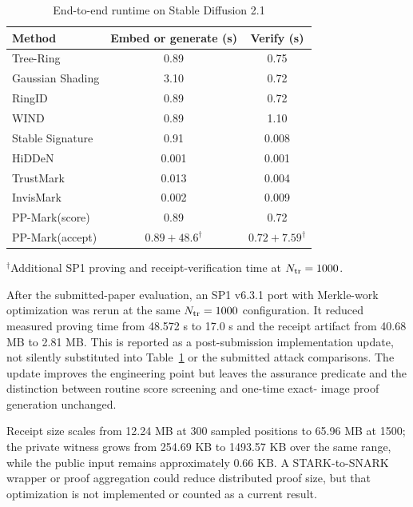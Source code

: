 \begin{table}[H]
    \centering
    \caption{End-to-end runtime on Stable Diffusion 2.1}
    \label{tab:ch4-runtime}
    \small
    \setlength{\tabcolsep}{15pt}
    \renewcommand{\arraystretch}{1.13}
    \begin{tabular}{@{}lcc@{}}
        \toprule
        Method & Embed or generate (s) & Verify (s) \\
        \midrule
        Tree-Ring        & 0.89 & 0.75 \\
        Gaussian Shading & 3.10 & 0.72 \\
        RingID           & 0.89 & 0.72 \\
        WIND             & 0.89 & 1.10 \\
        Stable Signature & 0.91 & 0.008 \\
        HiDDeN           & 0.001 & 0.001 \\
        TrustMark        & 0.013 & 0.004 \\
        InvisMark        & 0.002 & 0.009 \\
        PP-Mark(score)   & 0.89 & 0.72 \\
        PP-Mark(accept)  & \(0.89+48.6^{\dagger}\) & \(0.72+7.59^{\dagger}\) \\
        \bottomrule
    \end{tabular}

    \vspace{2pt}
    \parbox{0.92\textwidth}{\footnotesize
    \(^{\dagger}\)Additional SP1 proving and receipt-verification time at
    \(N_{\mathrm{tr}}=1000\).}
\end{table}

After the submitted-paper evaluation, an SP1 v6.3.1 port with Merkle-work
optimization was rerun at the same \(N_{\mathrm{tr}}=1000\) configuration.  It
reduced measured proving time from 48.572 s to 17.0 s and the receipt artifact from
40.68 MB to 2.81 MB.  This is reported as a post-submission implementation update,
not silently substituted into Table~\ref{tab:ch4-runtime} or the submitted attack
comparisons.  The update improves the engineering point but leaves the assurance
predicate and the distinction between routine score screening and one-time exact-
image proof generation unchanged.

Receipt size scales from 12.24 MB at 300 sampled positions to 65.96 MB at 1500;
the private witness grows from 254.69 KB to 1493.57 KB over the same range, while
the public input remains approximately 0.66 KB.  A STARK-to-SNARK wrapper or proof
aggregation could reduce distributed proof size, but that optimization is not
implemented or counted as a current result.

